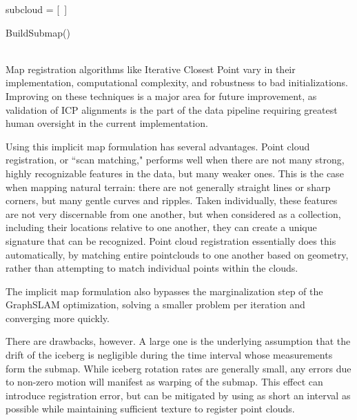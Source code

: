 \begin{algorithm}[H]
\DontPrintSemicolon
\label{alg.submap}
\SetAlgoLined
{}
subcloud = [~] \;
\caption{BuildSubmap() \label{BSM}}
\end{algorithm}
~\\

Map registration algorithms like Iterative Closest Point vary in their implementation, computational complexity, and robustness to bad initializations. Improving on these techniques is a major area for future improvement, as validation of ICP alignments is the part of the data pipeline requiring greatest human oversight in the current implementation.

Using this implicit map formulation has several advantages. Point cloud registration, or ``scan matching," performs well when there are not many strong, highly recognizable features in the data, but many weaker ones. This is the case when mapping natural terrain: there are not generally straight lines or sharp corners, but many gentle curves and ripples. Taken individually, these features are not very discernable from one another, but when considered as a collection, including their locations relative to one another, they can create a unique signature that can be recognized. Point cloud registration essentially does this automatically, by matching entire pointclouds to one another based on geometry, rather than attempting to match individual points within the clouds.

The implicit map formulation also bypasses the marginalization step of the GraphSLAM optimization, solving a smaller problem per iteration and converging more quickly. 

There are drawbacks, however. A large one is the underlying assumption that the drift of the iceberg is negligible during the time interval whose measurements form the submap. While iceberg rotation rates are generally small, any errors due to non-zero motion will manifest as warping of the submap. This effect can introduce registration error, but can be mitigated by using as short an interval as possible while maintaining sufficient texture to register point clouds.

